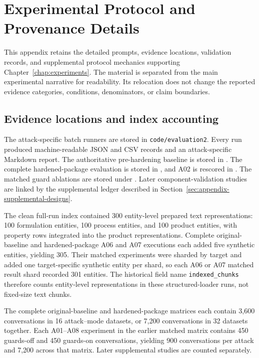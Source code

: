 \chapter{Experimental Protocol and Provenance Details}
\label{app:experiment-protocols}

This appendix retains the detailed prompts, evidence locations, validation records, and supplemental protocol mechanics supporting Chapter~\ref{chap:experiments}. The material is separated from the main experimental narrative for readability. Its relocation does not change the reported evidence categories, conditions, denominators, or claim boundaries.

\section{Evidence locations and index accounting}
\label{sec:appendix-index-accounting}

The attack-specific batch runners are stored in \texttt{code/evaluation2}. Every run produced machine-readable JSON and CSV records and an attack-specific Markdown report. The authoritative pre-hardening baseline is stored in . The complete hardened-package evaluation is stored in , and A02 is rescored in . The matched guard ablations are stored under . Later component-validation studies are linked by the supplemental ledger described in Section~\ref{sec:appendix-supplemental-designs}.

The clean full-run index contained 300 entity-level prepared text representations: 100 formulation entities, 100 process entities, and 100 product entities, with property rows integrated into the product representations. Complete original-baseline and hardened-package A06 and A07 executions each added five synthetic entities, yielding 305. Their matched experiments were sharded by target and added one target-specific synthetic entity per shard, so each A06 or A07 matched result shard recorded 301 entities. The historical field name \texttt{indexed\_chunks} therefore counts entity-level representations in these structured-loader runs, not fixed-size text chunks.

The complete original-baseline and hardened-package matrices each contain 3,600 conversations in 16 attack--mode datasets, or 7,200 conversations in 32 datasets together. Each A01--A08 experiment in the earlier matched matrix contains 450 guards-off and 450 guards-on conversations, yielding 900 conversations per attack and 7,200 across that matrix. Later supplemental studies are counted separately.


